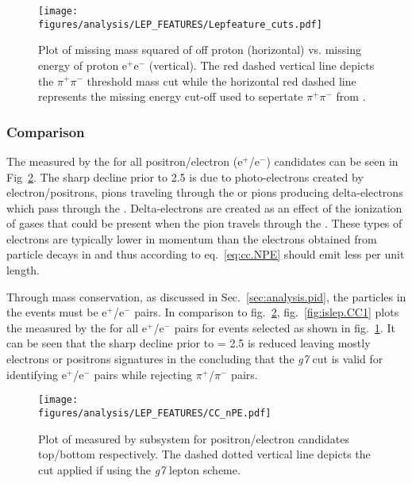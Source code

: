\begin{figure}[h!]\begin{center}
\texttt{[image: \\figures/analysis/LEP\_FEATURES/Lepfeature\_cuts.pdf]}
\caption[Cuts Applied to Isolate \piz and $\pi^{+}\pi^{-}$ for  Validation]{\label{fig:islep.cuts}Plot of missing mass squared of off proton (horizontal) vs. missing energy of proton e$^+$e$^-$ (vertical). The red dashed vertical line depicts the $\pi^{+}\pi^{-}$ threshold mass cut while the horizontal red dashed line represents the missing energy cut-off used to sepertate $\pi^{+}\pi^{-}$ from \piz.}
\end{center}\end{figure}

\subsubsection{ Comparison}

The  measured by the  for all positron/electron (e$^+$/e$^-$) candidates can be seen in Fig~\ref{fig:islep.CC}. The sharp decline prior to 2.5  is due to photo-electrons created by electron/positrons, pions traveling through the  or pions producing delta-electrons which pass through the . Delta-electrons are created as an effect of the ionization of gases that could be present when the pion travels through the . These types of electrons are typically lower in momentum than the electrons obtained from particle decays in  and thus according to eq.~\ref{eq:cc.NPE} should emit less  per unit length.

Through mass conservation, as discussed in Sec.~\ref{sec:analysis.pid}, the particles in the \piz events must be e$^+$/e$^-$ pairs. In comparison to fig.~\ref{fig:islep.CC}, fig.~\ref{fig:islep.CC1} plots the  measured by the  for all e$^+$/e$^-$ pairs for \piz events selected as shown in fig.~\ref{fig:islep.cuts}. It can be seen that the sharp decline prior to  = 2.5 is reduced leaving mostly electrons or positrons signatures in the  concluding that the \emph{g7}   cut is valid for identifying e$^+$/e$^-$ pairs while rejecting $\pi^+$/$\pi^-$ pairs.
 
%
\begin{figure}[h!]\begin{center}
\texttt{[image: \\figures/analysis/LEP\_FEATURES/CC\_nPE.pdf]}
\caption[Number of Photo-electrons Measured by  for All e$^-$ and e$^+$ Candidates]{\label{fig:islep.CC}Plot of  measured by   subsystem for positron/electron candidates top/bottom respectively. The dashed dotted vertical line depicts the cut applied if using the \emph{g7} lepton  scheme.}
\end{center}\end{figure}

